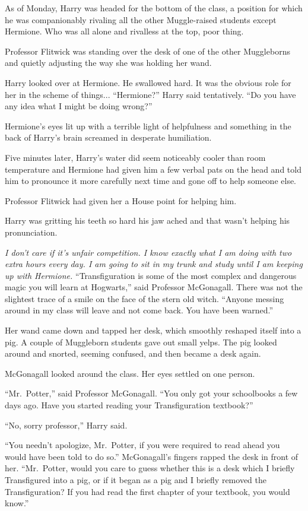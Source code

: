 As of Monday, Harry was headed for the bottom of the class, a position for which he was companionably rivaling all the other Muggle-raised students except Hermione. Who was all alone and rivalless at the top, poor thing.

Professor Flitwick was standing over the desk of one of the other Muggleborns and quietly adjusting the way she was holding her wand.

Harry looked over at Hermione. He swallowed hard. It was the obvious role for her in the scheme of things... “Hermione?” Harry said tentatively. “Do you have any idea what I might be doing wrong?”

Hermione’s eyes lit up with a terrible light of helpfulness and something in the back of Harry’s brain screamed in desperate humiliation.

Five minutes later, Harry’s water did seem noticeably cooler than room temperature and Hermione had given him a few verbal pats on the head and told him to pronounce it more carefully next time and gone off to help someone else.

Professor Flitwick had given her a House point for helping him.

Harry was gritting his teeth so hard his jaw ached and that wasn’t helping his pronunciation.

\emph{I don’t care if it’s unfair competition. I know exactly what I am doing with two extra hours every day. I am going to sit in my trunk and study until I am keeping up with Hermione.}
\sbreak
“Transfiguration is some of the most complex and dangerous magic you will learn at Hogwarts,” said Professor McGonagall. There was not the slightest trace of a smile on the face of the stern old witch. “Anyone messing around in my class will leave and not come back. You have been warned.”

Her wand came down and tapped her desk, which smoothly reshaped itself into a pig. A couple of Muggleborn students gave out small yelps. The pig looked around and snorted, seeming confused, and then became a desk again.

McGonagall looked around the class. Her eyes settled on one person.

“Mr.~Potter,” said Professor McGonagall. “You only got your schoolbooks a few days ago. Have you started reading your Transfiguration textbook?”

“No, sorry professor,” Harry said.

“You needn’t apologize, Mr.~Potter, if you were required to read ahead you would have been told to do so.” McGonagall’s fingers rapped the desk in front of her. “Mr.~Potter, would you care to guess whether this is a desk which I briefly Transfigured into a pig, or if it began as a pig and I briefly removed the Transfiguration? If you had read the first chapter of your textbook, you would know.”


